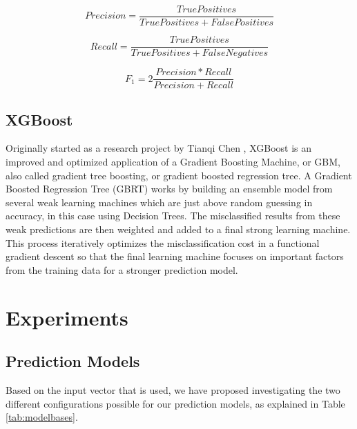 \documentclass[review]{elsarticle}
\begin{document}
\begin{equation}\label{eq:5}
Precision = \frac{True Positives}{True Positives + False Positives}
\end{equation}

\begin{equation}\label{eq:6}
Recall = \frac{True Positives}{True Positives + False Negatives}
\end{equation}

\begin{equation}\label{eq:7}
F_{1} = 2  \frac{Precision * Recall}{Precision + Recall}
\end{equation}

\subsection{XGBoost}
\label{xgboost}

Originally started as a research project by Tianqi Chen \cite{36}, XGBoost is an improved and optimized application of a Gradient Boosting Machine, or GBM, also called gradient tree boosting, or gradient boosted regression tree. A Gradient Boosted Regression Tree (GBRT) works by building an ensemble model from several weak learning machines which are just above random guessing in accuracy, in this case using Decision Trees. The misclassified results from these weak predictions are then weighted and added to a final strong learning machine. This process iteratively optimizes the misclassification cost in a functional gradient descent so that the final learning machine focuses on important factors from the training data for a stronger prediction model. 

\section{Experiments}
\label{experiments}

\subsection{Prediction Models}
\label{pred_models}

Based on the input vector that is used, we have proposed investigating the two different configurations possible for our prediction models, as explained in Table \ref{tab:modelbases}.
\end{document}
